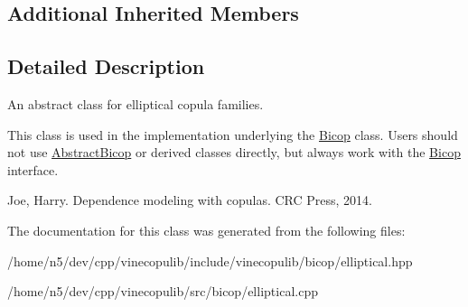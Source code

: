 \subsection*{Additional Inherited Members}


\subsection{Detailed Description}
An abstract class for elliptical copula families. 

This class is used in the implementation underlying the \hyperlink{classvinecopulib_1_1_bicop}{Bicop} class. Users should not use \hyperlink{classvinecopulib_1_1_abstract_bicop}{Abstract\+Bicop} or derived classes directly, but always work with the \hyperlink{classvinecopulib_1_1_bicop}{Bicop} interface.

Joe, Harry. Dependence modeling with copulas. C\+RC Press, 2014. 

The documentation for this class was generated from the following files\+:\begin{DoxyCompactItemize}
\item 
/home/n5/dev/cpp/vinecopulib/include/vinecopulib/bicop/elliptical.\+hpp\item 
/home/n5/dev/cpp/vinecopulib/src/bicop/elliptical.\+cpp\end{DoxyCompactItemize}
